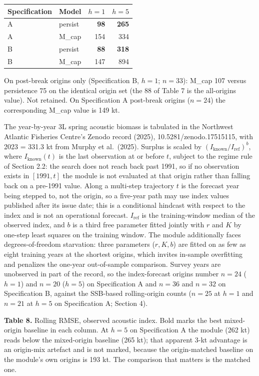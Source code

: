 \documentclass[11pt]{article}
\begin{document}
\begin{longtable}[]{@{}llrr@{}}
\toprule\noalign{}
Specification & Model & \(h=1\) & \(h=5\) \\
\midrule\noalign{}
\endhead
\bottomrule\noalign{}
\endlastfoot
A & persist & \textbf{98} & \textbf{265} \\
A & M\_cap & 154 & 334 \\
B & persist & \textbf{88} & \textbf{318} \\
B & M\_cap & 147 & 894 \\
\end{longtable}

On post-break origins only (Specification B, \(h=1\); \(n=33\)): M\_cap
107 versus persistence 75 on the identical origin set (the 88 of Table 7
is the all-origins value). Not retained. On Specification A post-break
origins (\(n=24\)) the corresponding M\_cap value is 149 kt.

The year-by-year 3L spring acoustic biomass is tabulated in the
Northwest Atlantic Fisheries Centre's Zenodo record (2025),
10.5281/zenodo.17515115, with 2023 = 331.3 kt from Murphy et al.~(2025).
Surplus is scaled by \((I_{\mathrm{known}}/I_{\mathrm{ref}})^{b}\),
where \(I_{\mathrm{known}}(t)\) is the last observation at or before
\(t\), subject to the regime rule of Section 2.2: the search does not
reach back past 1991, so if no observation exists in \([1991, t]\) the
module is not evaluated at that origin rather than falling back on a
pre-1991 value. Along a multi-step trajectory \(t\) is the forecast
year being stepped to, not the origin, so a five-year path may use index
values published after its issue date; this is a conditional hindcast
with respect to the index and is not an operational forecast. \(I_{\mathrm{ref}}\) is the training-window median of the
observed index, and \(b\) is a third free parameter fitted jointly with
\(r\) and \(K\) by one-step least squares on the training window. The
module additionally faces degrees-of-freedom starvation: three
parameters (\(r, K, b\)) are fitted on as few as eight training years at
the shortest origins, which invites in-sample overfitting and penalizes
the one-year out-of-sample comparison. Survey years are unobserved in
part of the record, so the index-forecast origins number \(n=24\)
(\(h=1\)) and \(n=20\) (\(h=5\)) on Specification A and \(n=36\) and
\(n=32\) on Specification B, against the SSB-based rolling-origin counts
(\(n=25\) at \(h=1\) and \(n=21\) at \(h=5\) on Specification A; Section
4).

\textbf{Table 8.} Rolling RMSE, observed acoustic index. Bold marks the
best mixed-origin baseline in each column. At \(h=5\) on Specification A
the module (262 kt) reads below the mixed-origin baseline (265 kt); that
apparent 3-kt advantage is an origin-mix artefact and is not marked,
because the origin-matched baseline on the module's own origins is
193 kt. The comparison that matters is the matched one.
\end{document}
